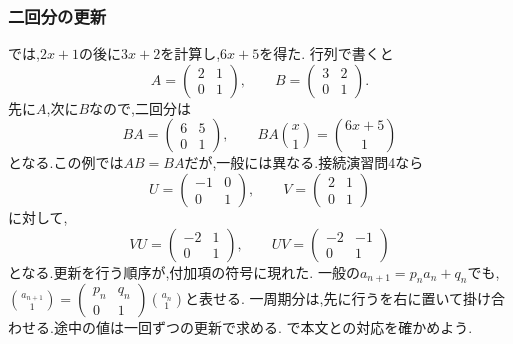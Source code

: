 \subsubsection{二回分の更新}\label{節：二回分の更新}
では,$2x+1$の後に$3x+2$を計算し,$6x+5$を得た.
行列で書くと
\[
  A=\begin{pmatrix}2&1\\0&1\end{pmatrix},\qquad
  B=\begin{pmatrix}3&2\\0&1\end{pmatrix}.
\]
先に$A$,次に$B$なので,二回分は
\[
  BA=\begin{pmatrix}6&5\\0&1\end{pmatrix},\qquad
  BA\binom{x}{1}=\binom{6x+5}{1}
\]
となる.この例では$AB=BA$だが,一般には異なる.接続演習問4なら
\[
  U=\begin{pmatrix}-1&0\\0&1\end{pmatrix},\qquad
  V=\begin{pmatrix}2&1\\0&1\end{pmatrix}
\]
に対して,
\[
  VU=\begin{pmatrix}-2&1\\0&1\end{pmatrix},\qquad
  UV=\begin{pmatrix}-2&-1\\0&1\end{pmatrix}
\]
となる.更新を行う順序が,付加項の符号に現れた.
一般の$a_{n+1}=p_na_n+q_n$でも,$\binom{a_{n+1}}1=
  \begin{pmatrix}p_n&q_n\\0&1\end{pmatrix}\binom{a_n}1$と表せる.
一周期分は,先に行うを右に置いて掛け合わせる.途中の値は一回ずつの更新で求める.
で本文との対応を確かめよう.
